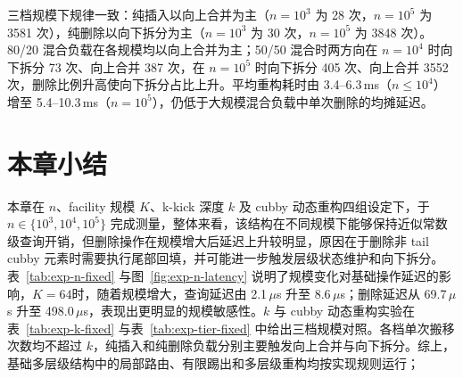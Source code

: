 三档规模下规律一致：纯插入以向上合并为主（\(n=10^3\) 为 28 次，\(n=10^5\) 为 3581 次），纯删除以向下拆分为主（\(n=10^3\) 为 30 次，\(n=10^5\) 为 3848 次）。80/20 混合负载在各规模均以向上合并为主；50/50 混合时两方向在 \(n=10^4\) 时向下拆分 73 次、向上合并 387 次，在 \(n=10^5\) 时向下拆分 405 次、向上合并 3552 次，删除比例升高使向下拆分占比上升。平均重构耗时由 3.4--6.3\,ms（\(n\le 10^4\)）增至 5.4--10.3\,ms（\(n=10^5\)），仍低于大规模混合负载中单次删除的均摊延迟。

\section{本章小结}

本章在 \(n\)、facility 规模 \(K\)、k-kick 深度 \(k\) 及 cubby 动态重构四组设定下，于 \(n\in\{10^3,10^4,10^5\}\) 完成测量，整体来看，该结构在不同规模下能够保持近似常数级查询开销，但删除操作在规模增大后延迟上升较明显，原因在于删除非 tail cubby 元素时需要执行尾部回填，并可能进一步触发层级状态维护和向下拆分。表~\ref{tab:exp-n-fixed} 与图~\ref{fig:exp-n-latency} 说明了规模变化对基础操作延迟的影响，\(K = 64\)时，随着规模增大，查询延迟由 2.1\,$\mu$s 升至 8.6\,$\mu$s；删除延迟从  69.7\,$\mu$s 升至 498.0\,$\mu$s，表现出更明显的规模敏感性。\(k\) 与 cubby 动态重构实验在表~\ref{tab:exp-k-fixed} 与表~\ref{tab:exp-tier-fixed} 中给出三档规模对照。各档单次搬移次数均不超过 \(k\)，纯插入和纯删除负载分别主要触发向上合并与向下拆分。综上，基础多层级结构中的局部路由、有限踢出和多层级重构均按实现规则运行；
